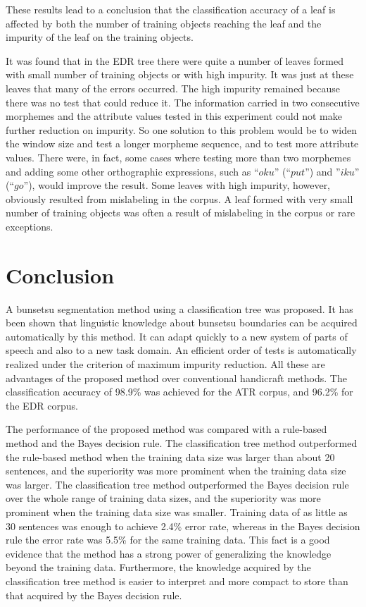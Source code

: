 These results lead to a conclusion that the classification accuracy
of a leaf 
is affected by both the number of training objects
reaching the leaf and the impurity of the leaf on the training
objects.

 It was found that in the EDR tree there were quite a number of leaves 
formed with small number  of training objects  or with high impurity. It was just
at these leaves that many of the errors occurred. The high impurity
remained  because there was no test that could reduce  it. The information
carried in two consecutive morphemes  and 
the attribute values tested in this experiment could not make 
further reduction on impurity. So one solution to this problem would be to
widen the window size and  test a longer  morpheme sequence, and  to test  more  attribute values.
There were, in fact, some cases where
testing more than two morphemes and adding some other orthographic 
expressions, such as  ``$oku$'' (``$put$'') and  ''$iku$'' (``$go$''), would improve the result. 
Some leaves with high impurity, however, obviously resulted from
mislabeling in the corpus. A leaf formed with very small number  of
training objects  was often a result of
mislabeling in the corpus or rare exceptions. 
\section{Conclusion}
A bunsetsu segmentation method using a classification tree was
proposed. It has been
shown that linguistic knowledge about bunsetsu boundaries can be
acquired automatically by this method. It can adapt quickly to a new 
system of parts of speech and
also to a new task domain. An efficient order of tests is
automatically realized under the criterion of maximum impurity reduction. All these
are advantages of the proposed method over conventional handicraft methods. The
classification accuracy  of 98.9\%  was achieved for the ATR corpus, and 96.2\% for the EDR corpus.

The performance of  the proposed method  was compared  with a 
rule-based method and 
the Bayes decision rule.
The classification tree method 
outperformed the rule-based method when the training data size was
larger than about 20 sentences,  and the
superiority was more prominent when the training data size was larger.
The classification tree method outperformed the Bayes decision rule
over the whole range of training data sizes, and the superiority 
was more prominent when the training data size was
smaller.  Training data of as little as 30
sentences  was enough to achieve 2.4\% error rate, whereas
 in  the Bayes decision rule the error rate was
 5.5\%  for  the same training data.
This fact is a good
evidence that the method has a strong power of generalizing the
knowledge beyond the 
training data.
Furthermore, the knowledge acquired by the classification tree method
is easier to interpret and more compact to store than that acquired by the Bayes
decision rule.

